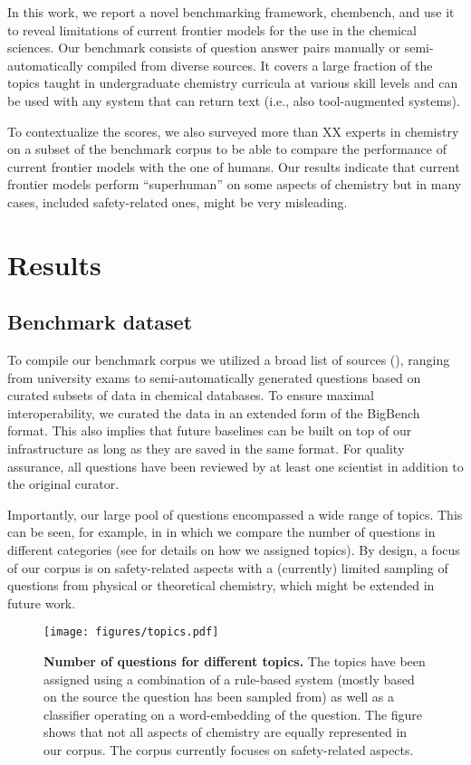 \documentclass[11pt, oneside]{aastex631}
\begin{document}
In this work, we report a novel benchmarking framework, chembench, and use it to reveal limitations of current frontier models for the use in the chemical sciences.
Our benchmark consists of  question answer pairs manually or semi-automatically compiled from diverse sources. 
It covers a large fraction of the topics taught in undergraduate chemistry curricula at various skill levels and can be used with any system that can return text (i.e., also tool-augmented systems).

To contextualize the scores, we also surveyed more than XX experts in chemistry on a subset of the benchmark corpus to be able to compare the performance of current frontier models with the one of humans.
Our results indicate that current frontier models perform \enquote{superhuman} on some aspects of chemistry but in many cases, included safety-related ones, might be very misleading. 


\section{Results}

\subsection{Benchmark dataset}

To compile our benchmark corpus we utilized a broad list of sources (), ranging from university exams to semi-automatically generated questions based on curated subsets of data in chemical databases. 
To ensure maximal interoperability, we curated the data in an extended form of the BigBench format. This also implies that future baselines can be built on top of our infrastructure as long as they are saved in the same format. 
For quality assurance, all questions have been reviewed by at least one scientist in addition to the original curator.

Importantly, our large pool of questions encompassed a wide range of topics. This can be seen, for example, in  in which we compare the number of questions in different categories (see  for details on how we assigned topics). 
By design, a focus of our corpus is on safety-related aspects with a (currently) limited sampling of questions from physical or theoretical chemistry, which might be extended in future work.

\begin{figure}
    \centering
    \texttt{[image: figures/topics.pdf]}
    \caption{\textbf{Number of questions for different topics.} The topics have been assigned using a combination of a rule-based system (mostly based on the source the question has been sampled from) as well as a classifier operating on a word-embedding of the question. The figure shows that not all aspects of chemistry are equally represented in our corpus. The corpus currently focuses on safety-related aspects.}
    \label{fig:topic_barplot}
\end{figure}
\end{document}
